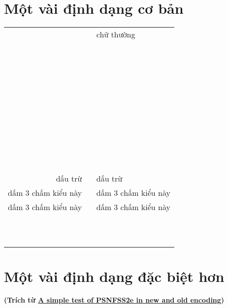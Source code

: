 \documentclass{article}
\begin{document}
\section{Một vài định dạng cơ bản}


\begin{tabular}{ r l }
	& chữ thường\\

\verb- - & \\

\verb- - & \\

\verb- - & \\

\verb- - & \\

\verb- - & \\


\verb- - & \\
\verb- - & \\

\verb- - & \\

\verb- - & \\

\verb= = & \\

\verb= = & \\%

\verb= = & \\%

dấu trừ \verb= = & dấu trừ  \\

dấm 3 chấm kiểu này \verb- - & dấm 3 chấm kiểu này \\
dấm 3 chấm kiểu này \verb- - & dấm 3 chấm kiểu này \\

\verb- - & \\
\verb- - & \\
\verb- - & \\
\end{tabular}

\section{Một vài định dạng đặc biệt hơn}
\textbf{(Trích từ \href{ftp://mirror.upm.edu.my/ctan/macros/latex/required/psnfss/}{A simple test of PSNFSS2e in new and old encoding})}
\end{document}
